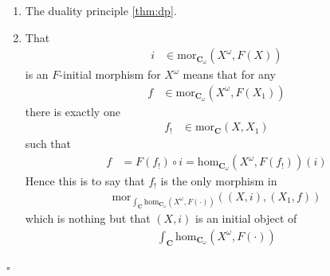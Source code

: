 \begin{prf}
\begin{enumerate}
\item[(1T)]
The duality principle \ref{thm:dp}.

\item[(1I)]
That
\begin{align*}
  i
  &\in
  \mathrm{mor}_{\mathbf{C}_{\omega}}(X^{\omega},F(X))
\end{align*}
is an $F$-initial morphism for $X^{\omega}$ means that for any
\begin{align*}
  f
  &\in
  \mathrm{mor}_{\mathbf{C}_{\omega}}(X^{\omega},F(X_{1}))
\end{align*}
there is exactly one
\begin{align*}
  f_{!}
  &\in
  \mathrm{mor}_{\mathbf{C}}(X,X_{1})
\end{align*}
such that
\begin{align*}
  f
  &=
  F(f_{!})
  \circ
  i
  =
  \mathrm{hom}_{\mathbf{C}_{\omega}}(X^{\omega},F(f_{!}))(i)
\end{align*}
Hence this is to say that $f_{!}$ is the only morphism in
\begin{align*}
  \mathrm{mor}_{\int_{\mathbf{C}}\mathrm{hom}_{\mathbf{C}_{\omega}}(X^{\omega},F(\cdot))}((X,i),(X_{1},f))
\end{align*}
which is nothing but that $(X,i)$ is an initial object of
\begin{align*}
  \int_{\mathbf{C}}
  \mathrm{hom}_{\mathbf{C}_{\omega}}(X^{\omega},F(\cdot))
\end{align*}
\end{enumerate}
\phantom{proven}
\hfill
$\square$
\end{prf}
